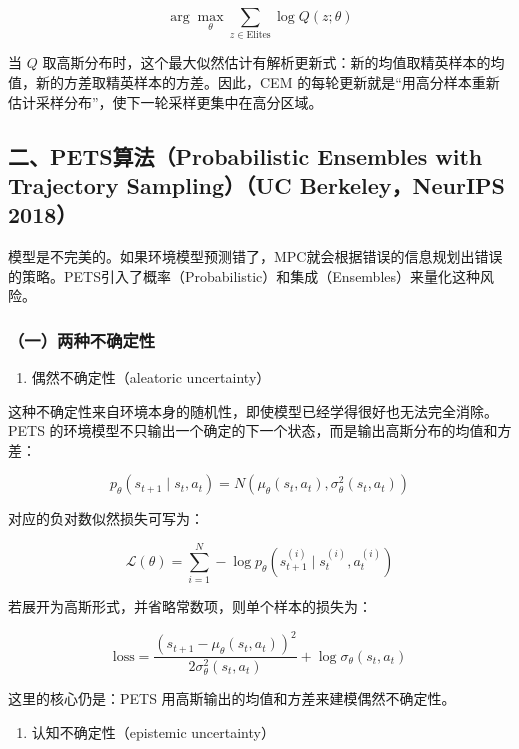 \[
\arg\max_\theta\sum_{z\in\mathrm{Elites}}\log Q(z;\theta)
\]

当 \(Q\) 取高斯分布时，这个最大似然估计有解析更新式：新的均值取精英样本的均值，新的方差取精英样本的方差。因此，CEM 的每轮更新就是``用高分样本重新估计采样分布''，使下一轮采样更集中在高分区域。

\hypertarget{ux4e8cpetsux7b97ux6cd5probabilistic-ensembles-with-trajectory-samplinguc-berkeleyneurips-2018}{%
\subsection{二、PETS算法（Probabilistic Ensembles with Trajectory Sampling）（UC Berkeley，NeurIPS 2018）}\label{ux4e8cpetsux7b97ux6cd5probabilistic-ensembles-with-trajectory-samplinguc-berkeleyneurips-2018}}

模型是不完美的。如果环境模型预测错了，MPC就会根据错误的信息规划出错误的策略。PETS引入了概率（Probabilistic）和集成（Ensembles）来量化这种风险。

\hypertarget{ux4e00ux4e24ux79cdux4e0dux786eux5b9aux6027}{%
\subsubsection{（一）两种不确定性}\label{ux4e00ux4e24ux79cdux4e0dux786eux5b9aux6027}}

\begin{enumerate}
\def\labelenumi{\arabic{enumi}.}
\tightlist
\item
  偶然不确定性（aleatoric uncertainty）
\end{enumerate}

这种不确定性来自环境本身的随机性，即使模型已经学得很好也无法完全消除。PETS 的环境模型不只输出一个确定的下一个状态，而是输出高斯分布的均值和方差：

\[
p_\theta(s_{t+1}\mid s_t,a_t)=N(\mu_\theta(s_t,a_t),\sigma_\theta^2(s_t,a_t))
\]

对应的负对数似然损失可写为：

\[
\mathcal L(\theta)=\sum_{i=1}^{N}-\log p_\theta(s_{t+1}^{(i)}\mid s_t^{(i)},a_t^{(i)})
\]

若展开为高斯形式，并省略常数项，则单个样本的损失为：

\[
\mathrm{loss}
=\frac{(s_{t+1}-\mu_\theta(s_t,a_t))^2}{2\sigma_\theta^2(s_t,a_t)}
+\log\sigma_\theta(s_t,a_t)
\]

这里的核心仍是：PETS 用高斯输出的均值和方差来建模偶然不确定性。

\begin{enumerate}
\def\labelenumi{\arabic{enumi}.}
\setcounter{enumi}{1}
\tightlist
\item
  认知不确定性（epistemic uncertainty）
\end{enumerate}

